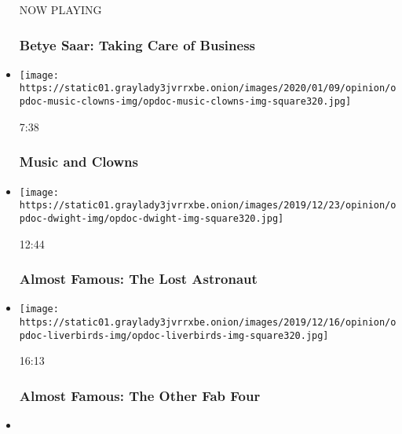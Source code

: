 \begin{itemize}
  NOW PLAYING

  \hypertarget{betye-saar-taking-care-of-business-2}{%
  \subsubsection{Betye Saar: Taking Care of
  Business}\label{betye-saar-taking-care-of-business-2}}
\item
  \href{https://www.nytimes3xbfgragh.onion/video/opinion/100000006831435/music-and-clowns.html?action=click\&module=video-series-bar\&region=header\&pgtype=Article\&playlistId=video/op-docs}{}

  \texttt{[image: https://static01.graylady3jvrrxbe.onion/images/2020/01/09/opinion/opdoc-music-clowns-img/opdoc-music-clowns-img-square320.jpg]}

  7:38

  \hypertarget{music-and-clowns}{%
  \subsubsection{Music and Clowns}\label{music-and-clowns}}
\item
  \href{https://www.nytimes3xbfgragh.onion/video/opinion/100000006865864/almost-famous-the-lost-astronaut.html?action=click\&module=video-series-bar\&region=header\&pgtype=Article\&playlistId=video/op-docs}{}

  \texttt{[image: https://static01.graylady3jvrrxbe.onion/images/2019/12/23/opinion/opdoc-dwight-img/opdoc-dwight-img-square320.jpg]}

  12:44

  \hypertarget{almost-famous-the-lost-astronaut}{%
  \subsubsection{Almost Famous: The Lost
  Astronaut}\label{almost-famous-the-lost-astronaut}}
\item
  \href{https://www.nytimes3xbfgragh.onion/video/opinion/100000006865876/almost-famous-the-other-fab-four.html?action=click\&module=video-series-bar\&region=header\&pgtype=Article\&playlistId=video/op-docs}{}

  \texttt{[image: https://static01.graylady3jvrrxbe.onion/images/2019/12/16/opinion/opdoc-liverbirds-img/opdoc-liverbirds-img-square320.jpg]}

  16:13

  \hypertarget{almost-famous-the-other-fab-four}{%
  \subsubsection{Almost Famous: The Other Fab
  Four}\label{almost-famous-the-other-fab-four}}
\item
  \href{https://www.nytimes3xbfgragh.onion/video/opinion/100000006865878/almost-famous-kim-i-am.html?action=click\&module=video-series-bar\&region=header\&pgtype=Article\&playlistId=video/op-docs}{}


\end{itemize}
